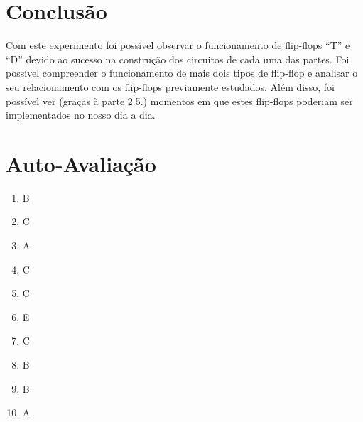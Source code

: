 \documentclass[12pt]{article}
\begin{document}
\section{Conclusão}
\label{sec:Conclusao}

Com este experimento foi possível observar o funcionamento de flip-flops “T” e “D” devido ao sucesso na construção dos circuitos de cada uma das partes. Foi possível compreender o funcionamento de mais dois tipos de flip-flop e analisar o seu relacionamento com os flip-flops previamente estudados. Além disso, foi possível ver (graças à parte 2.5.) momentos em que estes flip-flops poderiam ser implementados no nosso dia a dia.

\newpage 
\section*{Auto-Avaliação}

\begin{enumerate}
    \item B
    \item C
    \item A
    \item C
    \item C
    \item E
    \item C
    \item B
    \item B
    \item A
\end{enumerate}
\end{document}
